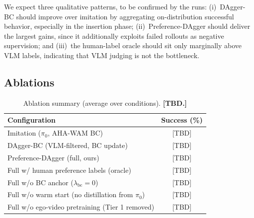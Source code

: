 \documentclass[letterpaper, 10pt, conference]{ieeeconf}
\begin{document}
\begin{table}[!htbp]
\centering
\caption{Plug grasp-and-insert success across conditions. Entries are successful/total trials (\%). \textbf{[All numbers TBD pending real-robot runs.]}}
\label{tab:main}
\end{table}

We expect three qualitative patterns, to be confirmed by the runs: (i)~DAgger-BC should improve over imitation by aggregating on-distribution successful behavior, especially in the insertion phase; (ii)~Preference-DAgger should deliver the largest gains, since it additionally exploits failed rollouts as negative supervision; and (iii)~the human-label oracle should sit only marginally above VLM labels, indicating that VLM judging is not the bottleneck.

\subsection{Ablations}
\label{subsec:ablations}

\begin{table}[!htbp]
\centering
\caption{Ablation summary (average over conditions). \textbf{[TBD.]}}
\label{tab:ablation}
\begin{tabular}{lc}
\toprule
\textbf{Configuration} & \textbf{Success (\%)} \\
\midrule
Imitation ($\pi_0$, AHA-WAM BC) & [TBD] \\
\;\;DAgger-BC (VLM-filtered, BC update) & [TBD] \\
\;\;Preference-DAgger (full, ours) & [TBD] \\
\midrule
Full w/ human preference labels (oracle) & [TBD] \\
Full w/o BC anchor ($\lambda_{\text{bc}}{=}0$) & [TBD] \\
Full w/o warm start (no distillation from $\pi_0$) & [TBD] \\
Full w/o ego-video pretraining (Tier 1 removed) & [TBD] \\
\bottomrule
\end{tabular}
\end{table}
\end{document}
